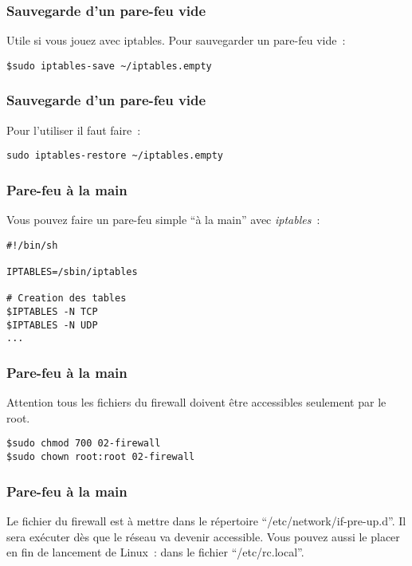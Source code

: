 \begin{frame}[containsverbatim]
\frametitle{Sauvegarde d'un pare-feu vide}

Utile si vous jouez avec iptables. Pour sauvegarder un pare-feu vide~:

\begin{verbatim}
$sudo iptables-save ~/iptables.empty
\end{verbatim}
\end{frame}


\begin{frame}[containsverbatim]
\frametitle{Sauvegarde d'un pare-feu vide}
Pour l'utiliser il faut faire~:

\begin{verbatim}
sudo iptables-restore ~/iptables.empty
\end{verbatim}
\end{frame}


\begin{frame}[containsverbatim]
\frametitle{Pare-feu à la main}

Vous pouvez faire un pare-feu simple ``à la main'' avec \emph{iptables}~:
\begin{verbatim}
#!/bin/sh

IPTABLES=/sbin/iptables

# Creation des tables
$IPTABLES -N TCP
$IPTABLES -N UDP
...
\end{verbatim}

\end{frame}

\begin{frame}[containsverbatim]
\frametitle{Pare-feu à la main}

Attention tous les fichiers du firewall doivent être accessibles seulement par le root.
\begin{verbatim}
$sudo chmod 700 02-firewall
$sudo chown root:root 02-firewall
\end{verbatim}

\end{frame}

\begin{frame}[containsverbatim]
\frametitle{Pare-feu à la main}

Le fichier du firewall est à mettre dans le répertoire ``/etc/network/if-pre-up.d''. Il sera exécuter dès que le réseau va devenir accessible. Vous pouvez aussi le placer en fin de lancement de Linux~: dans le fichier ``/etc/rc.local''.

\end{frame}

